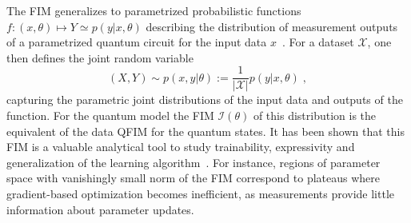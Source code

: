 \documentclass[aps,10pt,groupedaddress,prx,superscriptaddress,twocolumn,balancelastpage, tightenlines]{revtex4-2}
\theoremstyle{plain}  %
\begin{document}



The FIM generalizes to parametrized probabilistic functions $f: (x , \theta) \mapsto Y\simeq p(y|x,\theta)$ describing the distribution of measurement outputs of a parametrized quantum circuit for the input data $x$~\cite{abbas2021power}. For a dataset $ \mathcal{X}$, one then defines the joint random variable 
\begin{equation}\label{eq: XYtogether}
(X,Y) \sim p(x,y|\theta):=\frac{1}{|\mathcal{X}|} p(y|x, \theta) \; ,
\end{equation}
capturing the parametric joint distributions of the input data and outputs of the function. For the quantum model the FIM $\mathcal{I}(\theta)$ of this distribution is the equivalent of the data QFIM for the quantum states. It has been shown that this FIM is a valuable analytical tool to study trainability, expressivity and generalization of the learning algorithm~\cite{abbas2021power}. For instance, regions of parameter space with vanishingly small norm of the  FIM  correspond to plateaus where gradient-based optimization becomes inefficient, as measurements provide little information about parameter updates. 
\end{document}
